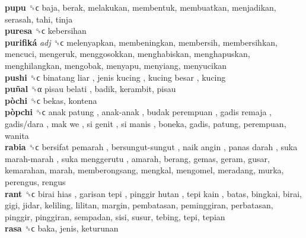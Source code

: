 \textbf{pupu} ␝ϲ  baja, berak, melakukan, membentuk, membuatkan, menjadikan, serasah, tahi, tinja  \\
\textbf{puresa} ␝ϲ  kebersihan  \\
\textbf{purifiká} \emph{adj}  ␝ϲ  melenyapkan, membeningkan, membersih, membersihkan, mencuci, mengeruk, menggosokkan, menghabiskan, menghapuskan, menghilangkan, mengobak, menyapu, menyiang, menyucikan  \\
\textbf{pushi} ␝ϲ   binatang liar ,  jenis kucing ,  kucing besar , kucing  \\
\textbf{puñal} ␝α   pisau belati , badik, kerambit, pisau  \\
\textbf{pòchi} ␝ϲ  bekas, kontena  \\
\textbf{pòpchi} ␝ϲ   anak patung ,  anak-anak ,  budak perempuan ,  gadis remaja ,  gadis/dara ,  mak we ,  si genit ,  si manis , boneka, gadis, patung, perempuan, wanita  \\
\textbf{rabia} ␝ϲ   bersifat pemarah ,  bersungut-sungut ,  naik angin ,  panas darah ,  suka marah-marah ,  suka menggerutu , amarah, berang, gemas, geram, gusar, kemarahan, marah, memberongsang, mengkal, mengomel, meradang, murka, perengus, rengus  \\
\textbf{rant} ␝ϲ   birai hias ,  garisan tepi ,  pinggir hutan ,  tepi kain , batas, bingkai, birai, gigi, jidar, keliling, lilitan, margin, pembatasan, peminggiran, perbatasan, pinggir, pinggiran, sempadan, sisi, susur, tebing, tepi, tepian  \\
\textbf{rasa} ␝ϲ  baka, jenis, keturunan  \\
